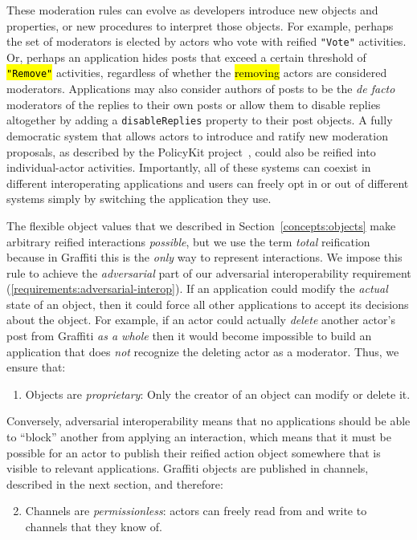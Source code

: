 These moderation rules can evolve as developers
introduce new objects and properties,
or new procedures to interpret those objects.
For example,
perhaps the set of moderators is elected by actors who vote with reified \texttt{"Vote"} activities.
Or, perhaps an application hides posts that exceed a certain threshold of \hl{\texttt{"Remove"}} activities,
regardless of whether the \hl{removing} actors are considered moderators.
Applications may also consider authors of posts to be the \emph{de facto} moderators of the replies to their
own posts or allow them to disable replies altogether by adding a \texttt{disableReplies}
property to their post objects.
A fully democratic system that allows actors to introduce and ratify new moderation proposals,
as described by the PolicyKit project~\cite{policykit}, could also be reified into
individual-actor activities.
Importantly, all of these systems can coexist in different interoperating
applications and users can freely opt in or out of different systems simply by switching
the application they use.

The flexible object values that we described in Section~\ref{concepts:objects} make arbitrary reified interactions \emph{possible}, but we use the term \emph{total} reification because in Graffiti this is the \emph{only} way to represent interactions.
We impose this rule to achieve the \emph{adversarial} part of our adversarial interoperability requirement (\ref{requirements:adversarial-interop}).
If an application could modify the \emph{actual} state of an object, then it could force all other applications to accept its decisions about the object.
For example, if an actor could actually \emph{delete} another actor's post
from Graffiti \emph{as a whole}
then it would become impossible to build
an application that does \emph{not} recognize the deleting actor as a moderator.
Thus, we ensure that:
\begin{enumerate}
\item
Objects are \emph{proprietary}: Only the creator of an object can modify or delete it.
\end{enumerate}
Conversely, adversarial interoperability means that no applications should be able to ``block'' another from applying an interaction, which means that it must be possible for an actor to publish
their reified action object somewhere that is visible
to relevant applications.
Graffiti objects are published in channels, described in the next
section, and therefore:
\begin{enumerate}
\setcounter{enumi}{1}
\item
Channels are \emph{permissionless}: actors can freely read from and write to channels that they know of.
\end{enumerate}

